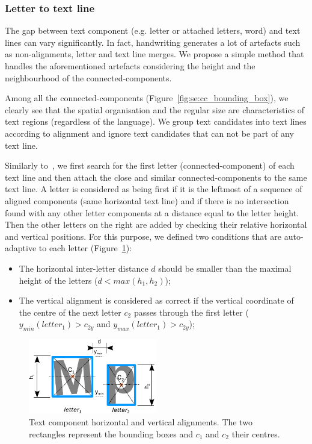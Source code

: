 \subsubsection{Letter to text line} %
\label{par:se:letter_to_line}
The gap between text component (e.g. letter or attached letters, word) and text lines can vary significantly.
In fact, handwriting generates a lot of artefacts such as non-alignments, letter and text line merges.
We propose a simple method that handles the aforementioned artefacts considering the height and the neighbourhood of the connected-components.

Among all the connected-components (Figure~\ref{fig:se:cc_bounding_box}), we clearly see that the spatial organisation and the regular size are characteristics of text regions (regardless of the language).
We group text candidates into text lines according to alignment and ignore text candidates that can not be part of any text line.

Similarly to~\cite{Clavelli09,Li2013Comic}, we first search for the first letter (connected-component) of each text line and then attach the close and similar connected-components to the same text line.
A letter is considered as being first if it is the leftmost of a sequence of aligned components (same horizontal text line) and if there is no intersection found with any other letter components at a distance equal to the letter height.
Then the other letters on the right are added by checking their relative horizontal and vertical positions.
For this purpose, we defined two conditions that are auto-adaptive to each letter (Figure~\ref{fig:se:letter_position}):

\begin{itemize}
    \item The horizontal inter-letter distance $d$ should be smaller than the maximal height of the letters ($d<max(h_1,h_2)$);
    \item The vertical alignment is considered as correct if the vertical coordinate of the centre of the next letter $c_2$ passes through the first letter ($y_{min}(letter_1)>c_{2y}$ and $y_{max}(letter_1)>c_{2y}$);
\end{itemize}


\begin{figure}[h!]	%
  \centering
	\includegraphics[trim= 0px 0px 0px 0px, clip, width=0.5\textwidth]{letter_position.pdf}
	\caption[Text component horizontal and vertical alignments]{Text component horizontal and vertical alignments. The two rectangles represent the bounding boxes and $c_1$ and $c_2$ their centres.}
	\label{fig:se:letter_position}
\end{figure}

